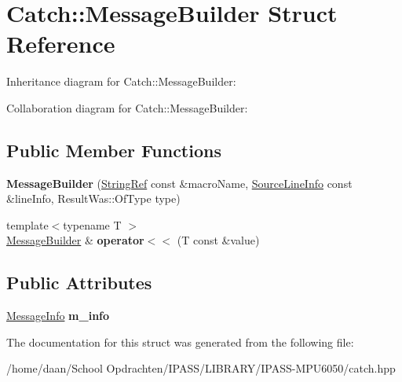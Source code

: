 \hypertarget{structCatch_1_1MessageBuilder}{}\section{Catch\+:\+:Message\+Builder Struct Reference}
\label{structCatch_1_1MessageBuilder}


Inheritance diagram for Catch\+:\+:Message\+Builder\+:


Collaboration diagram for Catch\+:\+:Message\+Builder\+:
\subsection*{Public Member Functions}
\begin{DoxyCompactItemize}
\item 
\mbox{\label{structCatch_1_1MessageBuilder_ac34832ca527a758f000ac233d32dd068}} 
{\bfseries Message\+Builder} (\hyperlink{classCatch_1_1StringRef}{String\+Ref} const \&macro\+Name, \hyperlink{structCatch_1_1SourceLineInfo}{Source\+Line\+Info} const \&line\+Info, Result\+Was\+::\+Of\+Type type)
\item 
\mbox{\label{structCatch_1_1MessageBuilder_a20fa48d069b20dddcc2d3df8abb123c1}} 
{\footnotesize template$<$typename T $>$ }\\\hyperlink{structCatch_1_1MessageBuilder}{Message\+Builder} \& {\bfseries operator$<$$<$} (T const \&value)
\end{DoxyCompactItemize}
\subsection*{Public Attributes}
\begin{DoxyCompactItemize}
\item 
\mbox{\label{structCatch_1_1MessageBuilder_a979f1c2b36d78f80ee275bfa5ba0209f}} 
\hyperlink{structCatch_1_1MessageInfo}{Message\+Info} {\bfseries m\+\_\+info}
\end{DoxyCompactItemize}


The documentation for this struct was generated from the following file\+:\begin{DoxyCompactItemize}
\item 
/home/daan/\+School Opdrachten/\+I\+P\+A\+S\+S/\+L\+I\+B\+R\+A\+R\+Y/\+I\+P\+A\+S\+S-\/\+M\+P\+U6050/catch.\+hpp\end{DoxyCompactItemize}
